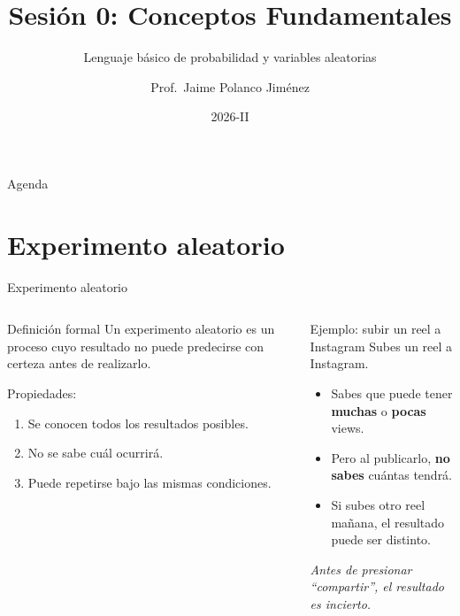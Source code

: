 \documentclass[aspectratio=169, 11pt]{beamer}
\title{Sesi\'on 0: Conceptos Fundamentales}
\subtitle{Lenguaje b\'asico de probabilidad y variables aleatorias}
\author{Prof.\ Jaime Polanco Jim\'enez}
\date{2026-II}
\begin{document}
\begin{frame}
\titlepage
\end{frame}

\begin{frame}{Agenda}
\tableofcontents
\end{frame}

\section{Experimento aleatorio}

\begin{frame}{Experimento aleatorio}
\begin{columns}[T]
\begin{block}{Definici\'on formal}
Un \alert{experimento aleatorio} es un proceso cuyo resultado no puede predecirse con certeza antes de realizarlo.

\vspace{0.5em}
Propiedades:
\begin{enumerate}
  \item Se conocen todos los resultados posibles.
  \item No se sabe cu\'al ocurrir\'a.
  \item Puede repetirse bajo las mismas condiciones.
\end{enumerate}
\end{block}

\begin{exampleblock}{Ejemplo: subir un reel a Instagram}
Subes un reel a Instagram.

\vspace{0.5em}
\begin{itemize}
  \item Sabes que puede tener \textbf{muchas} o \textbf{pocas} views.
  \item Pero al publicarlo, \textbf{no sabes} cu\'antas tendr\'a.
  \item Si subes otro reel ma\~nana, el resultado puede ser distinto.
\end{itemize}

\vspace{0.5em}
\textit{Antes de presionar ``compartir'', el resultado es incierto.}
\end{exampleblock}
\end{columns}
\end{frame}
\end{document}

